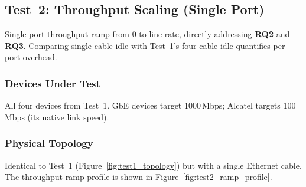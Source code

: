 \subsection{Test~2: Throughput Scaling (Single Port)}
\label{sec:test-throughput-scaling}

Single-port throughput ramp from 0 to line rate, directly addressing \textbf{RQ2} and \textbf{RQ3}. Comparing single-cable idle with Test~1's four-cable idle quantifies per-port overhead.

\subsubsection{Devices Under Test}
All four devices from Test~1. \ac{GbE} devices target 1000\,Mbps; Alcatel targets 100\,Mbps (its native link speed).

\subsubsection{Physical Topology}
Identical to Test~1 (Figure~\ref{fig:test1_topology}) but with a single Ethernet cable. The throughput ramp profile is shown in Figure~\ref{fig:test2_ramp_profile}.

